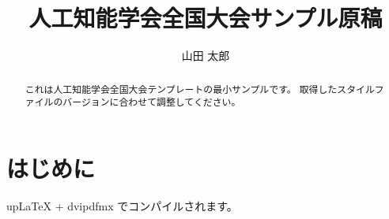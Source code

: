 \documentclass[twocolumn]{jsaiac}
\title{人工知能学会全国大会サンプル原稿}
\author{%
  山田 太郎\\
  \jaddress{神戸大学, yamada@example.ac.jp}%
}
\begin{document}
\maketitle

\begin{abstract}
これは人工知能学会全国大会テンプレートの最小サンプルです。
取得したスタイルファイルのバージョンに合わせて調整してください。
\end{abstract}

\section{はじめに}
upLaTeX + dvipdfmx でコンパイルされます。
\end{document}
